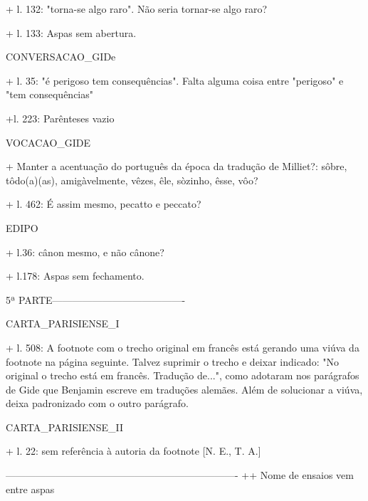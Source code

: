 + l. 132: "torna-se algo raro". Não seria tornar-se algo raro?

+ l. 133: Aspas sem abertura.

CONVERSACAO_GIDe

+ l. 35: "é perigoso tem consequências". Falta alguma coisa entre "perigoso" e "tem consequências"

+l. 223: Parênteses vazio

VOCACAO_GIDE

+ Manter a acentuação do português da época da tradução de Milliet?: sôbre, tôdo(a)(as), amigàvelmente, vêzes, êle, sòzinho, êsse, vôo?

+ l. 462: É assim mesmo, pecatto e peccato?

EDIPO

+ l.36: cânon mesmo, e não cânone?

+ l.178: Aspas sem fechamento.


5ª PARTE----------------------------------------

CARTA_PARISIENSE_I

+ l. 508: A footnote com o trecho original em francês está gerando uma viúva da footnote na página seguinte. Talvez suprimir o trecho e deixar indicado: "No original o trecho está em francês. Tradução de...", como adotaram nos parágrafos de Gide que Benjamin escreve em traduções alemães. Além de solucionar a viúva, deixa padronizado com o outro parágrafo.


CARTA_PARISIENSE_II

+ l. 22: sem referência à autoria da footnote [N. E., T. A.]



----------------------------------------------------------------------
++ Nome de ensaios vem entre aspas